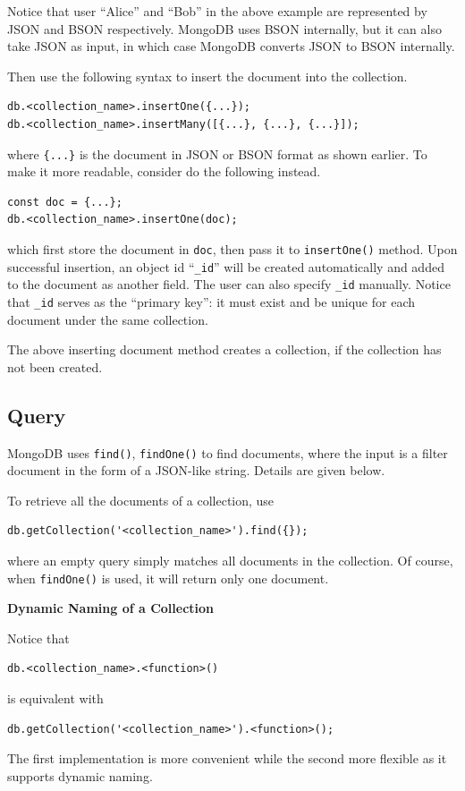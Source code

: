 Notice that user ``Alice'' and ``Bob'' in the above example are represented by JSON and BSON respectively. MongoDB uses BSON internally, but it can also take JSON as input, in which case MongoDB converts JSON to BSON internally.

Then use the following syntax to insert the document into the collection.
\begin{lstlisting}
db.<collection_name>.insertOne({...});
db.<collection_name>.insertMany([{...}, {...}, {...}]);
\end{lstlisting}
where \verb|{...}| is the document in JSON or BSON format as shown earlier. To make it more readable, consider do the following instead.
\begin{lstlisting}
const doc = {...};
db.<collection_name>.insertOne(doc);
\end{lstlisting}
which first store the document in \verb|doc|, then pass it to \verb|insertOne()| method. Upon successful insertion, an object id ``\verb|_id|'' will be created automatically and added to the document as another field. The user can also specify \verb|_id| manually. Notice that \verb|_id| serves as the ``primary key'': it must exist and be unique for each document under the same collection.

The above inserting document method creates a collection, if the collection has not been created.

\subsection{Query}

MongoDB uses \verb|find()|, \verb|findOne()| to find documents, where the input is a filter document in the form of a JSON-like string. Details are given below.

To retrieve all the documents of a collection, use
\begin{lstlisting}
db.getCollection('<collection_name>').find({});
\end{lstlisting}
where an empty query simply matches all documents in the collection. Of course, when \verb|findOne()| is used, it will return only one document.

\begin{mdframed}
\noindent \textbf{Dynamic Naming of a Collection}

Notice that
\begin{lstlisting}
db.<collection_name>.<function>()
\end{lstlisting}
is equivalent with
\begin{lstlisting}
db.getCollection('<collection_name>').<function>();
\end{lstlisting}
The first implementation is more convenient while the second more flexible as it supports dynamic naming.
\end{mdframed}

